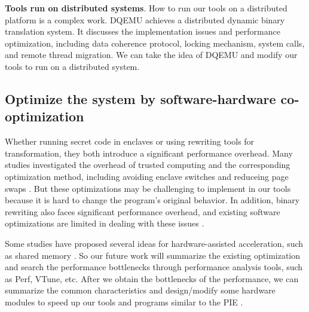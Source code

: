 \textbf{Tools run on distributed systems}.
How to run our tools on a distributed platform is a complex work.
DQEMU \cite{Zhao2020DQEMUAS} achieves a distributed dynamic binary translation system.
It discusses the implementation issues and performance optimization, including
data coherence protocol, locking mechanism, system calls, and remote thread migration.
We can take the idea of DQEMU and modify our tools to run on a distributed system.

\subsection{Optimize the system by software-hardware co-optimization}
\label{sec:ToolWithOptimization}
Whether running secret code in enclaves or using rewriting tools for transformation,
they both introduce a significant performance overhead.
Many studies investigated the overhead of trusted computing and 
the corresponding optimization method, including avoiding enclave switches
\cite{Tian2018SwitchlessCM} and reduceing page swaps \cite{Orenbach2017EleosEO, Taassori2018VAULTRP}.
But these optimizations may be challenging to implement in our tools because it is hard
to change the program's original behavior. 
In addition, binary rewriting also faces significant performance overhead, and existing
software optimizations are limited in dealing with these issues \cite{Kim2003HardwareSF}.

Some studies have proposed several ideas for hardware-assisted acceleration, such as
shared memory \cite{Jiang2022CRONUSFS}.
So our future work will summarize the existing optimization and search the performance
bottlenecks through performance analysis tools, such as Perf, VTune, etc.
After we obtain the bottlenecks of the performance, we can summarize the common characteristics
and design/modify some hardware modules to speed up our tools and programs similar to
the PIE \cite{Schneider2021PIEAP}.